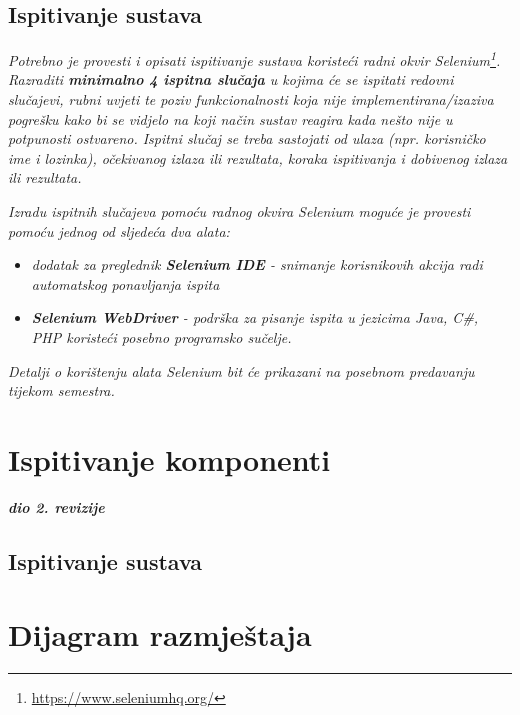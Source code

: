 			
			
			\subsection{Ispitivanje sustava}
			
			 \textit{Potrebno je provesti i opisati ispitivanje sustava koristeći radni okvir Selenium\footnote{\url{https://www.seleniumhq.org/}}. Razraditi \textbf{minimalno 4 ispitna slučaja} u kojima će se ispitati redovni slučajevi, rubni uvjeti te poziv funkcionalnosti koja nije implementirana/izaziva pogrešku kako bi se vidjelo na koji način sustav reagira kada nešto nije u potpunosti ostvareno. Ispitni slučaj se treba sastojati od ulaza (npr. korisničko ime i lozinka), očekivanog izlaza ili rezultata, koraka ispitivanja i dobivenog izlaza ili rezultata.\\ }
			 
			 \textit{Izradu ispitnih slučajeva pomoću radnog okvira Selenium moguće je provesti pomoću jednog od sljedeća dva alata:}
			 \begin{itemize}
			 	\item \textit{dodatak za preglednik \textbf{Selenium IDE} - snimanje korisnikovih akcija radi automatskog ponavljanja ispita	}
			 	\item \textit{\textbf{Selenium WebDriver} - podrška za pisanje ispita u jezicima Java, C\#, PHP koristeći posebno programsko sučelje.}
			 \end{itemize}
		 	\textit{Detalji o korištenju alata Selenium bit će prikazani na posebnom predavanju tijekom semestra.}
			
			\eject 
\newpage
        \section{Ispitivanje komponenti}
		    
		    \textbf{\textit{dio 2. revizije}}\\
        
        \subsection{Ispitivanje sustava}

\newpage

\section{Dijagram razmještaja}
			
